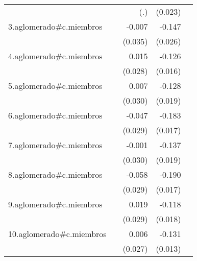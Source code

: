 {\begin{longtable}{l*{4}{D{.}{.}{-1}}}
            &                     &         (.)         &     (0.023)         &                     \\
\addlinespace
3.aglomerado#c.miembros&                     &      -0.007         &      -0.147\sym{***}&                     \\
            &                     &     (0.035)         &     (0.026)         &                     \\
\addlinespace
4.aglomerado#c.miembros&                     &       0.015         &      -0.126\sym{***}&                     \\
            &                     &     (0.028)         &     (0.016)         &                     \\
\addlinespace
5.aglomerado#c.miembros&                     &       0.007         &      -0.128\sym{***}&                     \\
            &                     &     (0.030)         &     (0.019)         &                     \\
\addlinespace
6.aglomerado#c.miembros&                     &      -0.047         &      -0.183\sym{***}&                     \\
            &                     &     (0.029)         &     (0.017)         &                     \\
\addlinespace
7.aglomerado#c.miembros&                     &      -0.001         &      -0.137\sym{***}&                     \\
            &                     &     (0.030)         &     (0.019)         &                     \\
\addlinespace
8.aglomerado#c.miembros&                     &      -0.058\sym{*}  &      -0.190\sym{***}&                     \\
            &                     &     (0.029)         &     (0.017)         &                     \\
\addlinespace
9.aglomerado#c.miembros&                     &       0.019         &      -0.118\sym{***}&                     \\
            &                     &     (0.029)         &     (0.018)         &                     \\
\addlinespace
10.aglomerado#c.miembros&                     &       0.006         &      -0.131\sym{***}&                     \\
            &                     &     (0.027)         &     (0.013)         &                     \\

\end{longtable}}
